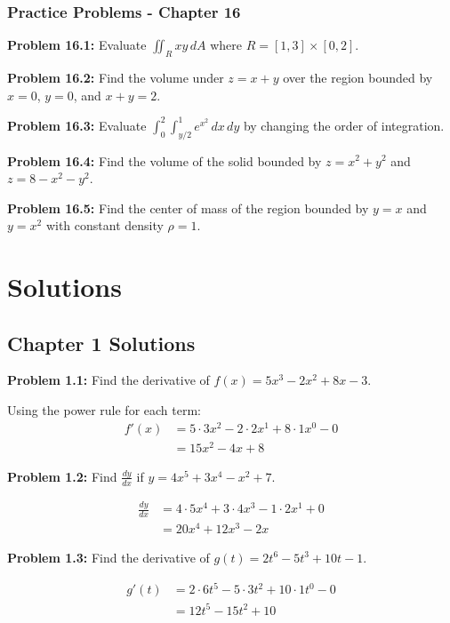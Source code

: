 \documentclass[12pt,a4paper]{book}
\theoremstyle{definition}
\begin{document}
\subsection{Practice Problems - Chapter 16}

\textbf{Problem 16.1:} Evaluate $\iint_R xy \, dA$ where $R = [1,3] \times [0,2]$.

\textbf{Problem 16.2:} Find the volume under $z = x + y$ over the region bounded by $x = 0$, $y = 0$, and $x + y = 2$.

\textbf{Problem 16.3:} Evaluate $\int_0^2 \int_{y/2}^1 e^{x^2} \, dx \, dy$ by changing the order of integration.

\textbf{Problem 16.4:} Find the volume of the solid bounded by $z = x^2 + y^2$ and $z = 8 - x^2 - y^2$.

\textbf{Problem 16.5:} Find the center of mass of the region bounded by $y = x$ and $y = x^2$ with constant density $\rho = 1$.

\chapter*{Solutions}

\section*{Chapter 1 Solutions}

\begin{solution}
\textbf{Problem 1.1:} Find the derivative of $f(x) = 5x^3 - 2x^2 + 8x - 3$.

Using the power rule for each term:
\begin{align}
f'(x) &= 5 \cdot 3x^2 - 2 \cdot 2x^1 + 8 \cdot 1x^0 - 0\\
&= 15x^2 - 4x + 8
\end{align}
\end{solution}

\begin{solution}
\textbf{Problem 1.2:} Find $\frac{dy}{dx}$ if $y = 4x^5 + 3x^4 - x^2 + 7$.

\begin{align}
\frac{dy}{dx} &= 4 \cdot 5x^4 + 3 \cdot 4x^3 - 1 \cdot 2x^1 + 0\\
&= 20x^4 + 12x^3 - 2x
\end{align}
\end{solution}

\begin{solution}
\textbf{Problem 1.3:} Find the derivative of $g(t) = 2t^6 - 5t^3 + 10t - 1$.

\begin{align}
g'(t) &= 2 \cdot 6t^5 - 5 \cdot 3t^2 + 10 \cdot 1t^0 - 0\\
&= 12t^5 - 15t^2 + 10
\end{align}
\end{solution}
\end{document}
